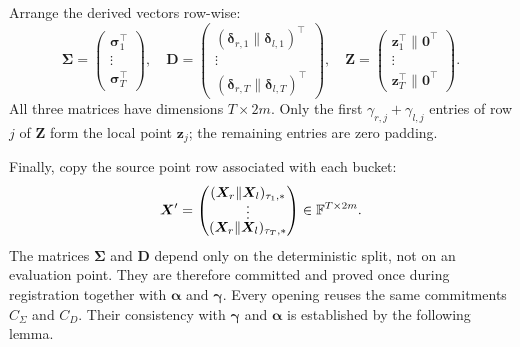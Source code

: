 Arrange the derived vectors row-wise:
\begin{equation}
\label{eq:compiled-point-matrices}
\bm\Sigma=
\begin{pmatrix}
\bm\sigma_1^\top\\[-1mm]
\vdots\\[-1mm]
\bm\sigma_T^\top
\end{pmatrix},
\quad
\bm D=
\begin{pmatrix}
(\bm\delta_{r,1}\|\bm\delta_{l,1})^\top\\[-1mm]
\vdots\\[-1mm]
(\bm\delta_{r,T}\|\bm\delta_{l,T})^\top
\end{pmatrix},
\quad
\bm Z=
\begin{pmatrix}
\bm z_1^\top\|\bm0^\top\\[-1mm]
\vdots\\[-1mm]
\bm z_T^\top\|\bm0^\top
\end{pmatrix}.
\end{equation}
All three matrices have dimensions $T\times2m$.  Only the first
$\gamma_{r,j}+\gamma_{l,j}$ entries of row $j$ of $\bm Z$ form the local
point $\bm z_j$; the remaining entries are zero padding.

Finally, copy the source point row associated with each bucket:
\begin{equation}
\label{eq:selected-point-matrix}
\bm X'
=
\begin{pmatrix}
(\bm X_r\|\bm X_l)_{\tau_1,*}\\[-1mm]
\vdots\\[-1mm]
(\bm X_r\|\bm X_l)_{\tau_T,*}
\end{pmatrix}
\in{\mathbb{F}}^{T\times2m}.
\end{equation}
The matrices $\bm\Sigma$ and $\bm D$ depend only on the deterministic split,
not on an evaluation point.  They are therefore committed and proved once
during registration together with $\bm\alpha$ and $\bm\gamma$.  Every opening
reuses the same commitments $C_\Sigma$ and $C_D$.  Their consistency with
$\bm\gamma$ and $\bm\alpha$ is established by the following lemma.

